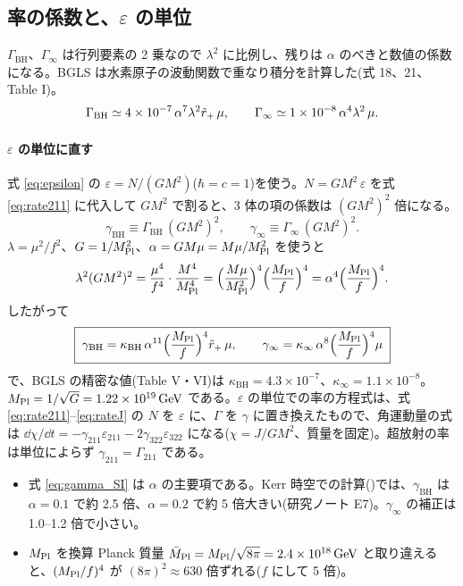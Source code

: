 \subsection{率の係数と、$\varepsilon$ の単位}

$\Gamma_\mathrm{BH}$、$\Gamma_\infty$ は行列要素の 2 乗なので $\lambda^2$ に比例し、残りは $\alpha$ のべきと数値の係数になる。BGLS は水素原子の波動関数で重なり積分を計算した(式 18、21、Table I)。
\begin{equation}
\Gamma_\mathrm{BH}\simeq4\times10^{-7}\,\alpha^7\lambda^2\tilde r_+\,\mu,\qquad
\Gamma_\infty\simeq1\times10^{-8}\,\alpha^4\lambda^2\,\mu.
\label{eq:GammaN_SI}
\end{equation}

\paragraph{$\varepsilon$ の単位に直す}
式 \eqref{eq:epsilon} の $\varepsilon=N/(GM^2)$($\hbar=c=1$)を使う。$N=GM^2\,\varepsilon$ を式 \eqref{eq:rate211} に代入して $GM^2$ で割ると、3 体の項の係数は $(GM^2)^2$ 倍になる。
\begin{equation}
\gamma_\mathrm{BH}\equiv\Gamma_\mathrm{BH}\,(GM^2)^2,\qquad \gamma_\infty\equiv\Gamma_\infty\,(GM^2)^2.
\end{equation}
$\lambda=\mu^2/f^2$、$G=1/M_\mathrm{Pl}^2$、$\alpha=GM\mu=M\mu/M_\mathrm{Pl}^2$ を使うと
\begin{equation}
\lambda^2(GM^2)^2=\frac{\mu^4}{f^4}\cdot\frac{M^4}{M_\mathrm{Pl}^4}=\Bigl(\frac{M\mu}{M_\mathrm{Pl}^2}\Bigr)^4\Bigl(\frac{M_\mathrm{Pl}}{f}\Bigr)^4=\alpha^4\Bigl(\frac{M_\mathrm{Pl}}{f}\Bigr)^4.
\end{equation}
したがって
\begin{equation}
\boxed{\;\gamma_\mathrm{BH}=\kappa_\mathrm{BH}\,\alpha^{11}\Bigl(\frac{M_\mathrm{Pl}}{f}\Bigr)^4\tilde r_+\,\mu,\qquad
\gamma_\infty=\kappa_\infty\,\alpha^{8}\Bigl(\frac{M_\mathrm{Pl}}{f}\Bigr)^4\mu\;}
\label{eq:gamma_SI}
\end{equation}
で、BGLS の精密な値(Table V・VI)は $\kappa_\mathrm{BH}=4.3\times10^{-7}$、$\kappa_\infty=1.1\times10^{-8}$。$M_\mathrm{Pl}=1/\sqrt G=1.22\times10^{19}\,\mathrm{GeV}$ である。$\varepsilon$ の単位での率の方程式は、式 \eqref{eq:rate211}--\eqref{eq:rateJ} の $N$ を $\varepsilon$ に、$\Gamma$ を $\gamma$ に置き換えたもので、角運動量の式は $\dd\chi/\dd t=-\gamma_{211}\varepsilon_{211}-2\gamma_{322}\varepsilon_{322}$ になる($\chi=J/GM^2$、質量を固定)。超放射の率は単位によらず $\gamma_{211}=\Gamma_{211}$ である。

\begin{caution}
\begin{itemize}
\item 式 \eqref{eq:gamma_SI} は $\alpha$ の主要項である。Kerr 時空での計算()では、$\gamma_\mathrm{BH}$ は $\alpha=0.1$ で約 2.5 倍、$\alpha=0.2$ で約 5 倍大きい(研究ノート E7)。$\gamma_\infty$ の補正は 1.0--1.2 倍で小さい。
\item $M_\mathrm{Pl}$ を換算 Planck 質量 $\bar M_\mathrm{Pl}=M_\mathrm{Pl}/\sqrt{8\pi}=2.4\times10^{18}\,\mathrm{GeV}$ と取り違えると、$(M_\mathrm{Pl}/f)^4$ が $(8\pi)^2\approx630$ 倍ずれる($f$ にして 5 倍)。
\end{itemize}
\end{caution}

